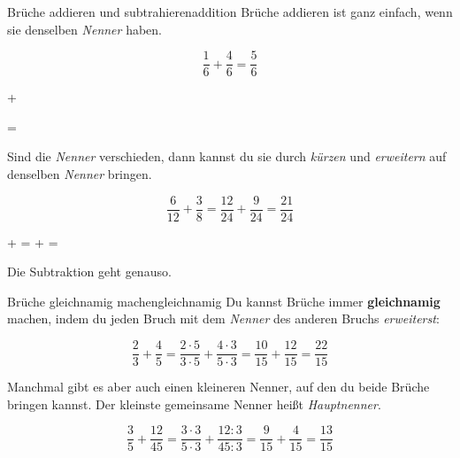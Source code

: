 \documentclass[12pt,a5paper,landscape]{scrartcl}
\begin{document}
	\begin{hilfekarte}{Brüche addieren und subtrahieren}{addition}
		Brüche addieren ist ganz einfach, wenn sie denselben \emph{Nenner} haben.
		\begin{multicols}{2}
			\[ \frac{1}{6} + \frac{4}{6} = \frac{5}{6} \]
			
			\begin{center}
				 +  = 
			\end{center}
		\end{multicols}
		\vspace{1cm}
		
		Sind die \emph{Nenner} verschieden, dann kannst du sie durch \emph{kürzen} und \emph{erweitern} auf denselben \emph{Nenner} bringen.
		
		\[ \frac{6}{12} + \frac{3}{8} = \frac{12}{24} + \frac{9}{24} = \frac{21}{24} \]
		
		\begin{center}
			  +
			 = 
			 + 
			 = 
		\end{center}
		
		Die Subtraktion geht genauso.
	\end{hilfekarte}

	\begin{hilfekarte}{Brüche gleichnamig machen}{gleichnamig}
		Du kannst Brüche immer \textbf{gleichnamig} machen, indem du jeden Bruch mit dem \emph{Nenner} des anderen Bruchs \emph{erweiterst}:
		
		\[ \frac{2}{3} + \frac{4}{5} = \frac{2\cdot 5}{3\cdot 5} + \frac{4\cdot 3}{5\cdot 3} = \frac{10}{15} + \frac{12}{15} = \frac{22}{15} \]
		
		\vspace{2cm}
		Manchmal gibt es aber auch einen kleineren Nenner, auf den du beide Brüche bringen kannst. Der kleinste gemeinsame Nenner heißt \emph{Hauptnenner}.
		
		\[ \frac{3}{5} + \frac{12}{45} = \frac{3\cdot 3}{5\cdot 3} + \frac{12 : 3}{45 : 3} = \frac{9}{15} + \frac{4}{15} = \frac{13}{15} \]
	\end{hilfekarte}
	
\end{document}
